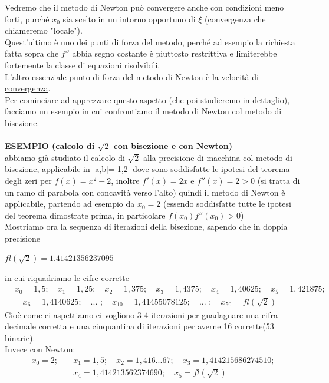 \documentclass[12pt]{article}
\begin{document}
Vedremo che il metodo di Newton può convergere anche con condizioni meno forti, purché $x_0$ sia scelto in un intorno opportuno di $\xi$ (convergenza che chiameremo "locale").\\
Quest'ultimo è uno dei punti di forza del metodo, perché ad esempio la richiesta fatta sopra che $f''$ abbia segno costante è piuttosto restrittiva e limiterebbe fortemente la classe di equazioni risolvibili.\\
L'altro essenziale punto di forza del metodo di Newton è la \underline{velocità di convergenza}.\\
Per cominciare ad apprezzare questo aspetto (che poi studieremo in dettaglio), facciamo un esempio in cui confrontiamo il metodo di Newton col metodo di bisezione.\\\\
\textbf{ESEMPIO (calcolo di $\sqrt{2}$ con bisezione e con Newton)}\\
abbiamo già studiato il calcolo di $\sqrt{2}$ alla precisione di macchina col metodo di bisezione, applicabile in [a,b]=[1,2] dove sono soddisfatte le ipotesi del teorema degli zeri per $f(x)=x^2-2$, inoltre $f'(x)=2x$ e $f''(x)=2>0$ (si tratta di un ramo di parabola con concavità verso l'alto) quindi il metodo di Newton è applicabile, partendo ad esempio da $x_0=2$ (essendo soddisfatte tutte le ipotesi del teorema dimostrate prima, in particolare $f(x_0)f''(x_0)>0$)\\
Mostriamo ora la sequenza di iterazioni della bisezione, sapendo che in doppia precisione
\begin{center}
    $fl(\sqrt{2})=1.41421356237095$
\end{center}
in cui riquadriamo le cifre corrette
\begin{equation*}
\begin{split}
    & x_0=\boxed{1},5;\quad x_1=\boxed{1},25; \quad x_2=\boxed{1},375; \quad x_3=\boxed{1,4}375; \quad x_4=\boxed{1,4}0625; \quad x_5=\boxed{1,4}21875;\\
    & \quad x_6=\boxed{1,41}40625; \quad \text{... } ; \quad x_{10}=\boxed{1,414}55078125; \quad \text{... }; \quad x_{50}=fl(\sqrt{2})
\end{split}
\end{equation*}
Cioè come ci aspettiamo ci vogliono 3-4 iterazioni per guadagnare una cifra decimale corretta e una cinquantina di iterazioni per averne 16 corrette(53 binarie).\\
Invece con Newton:
\begin{equation*}
\begin{split}
     x_0=2;\quad & x_1=\boxed{1},5; \quad x_2=\boxed{1,41}6...67; \quad x_3=\boxed{1,41421}5686274510;\\ & x_4=\boxed{1,41421356237}4690; \quad x_5=fl(\sqrt{2})
\end{split}
\end{equation*}
\end{document}
